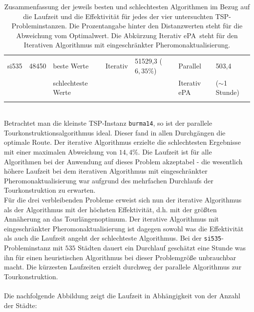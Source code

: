 \documentclass[doktyp=barbeit, sprache=german]{TUBAFarbeiten}
\begin{document}
\begin{table}[]
{\begin{tabular}{@{}lllllll@{}}
si535     & 48450   & \multicolumn{1}{l|}{beste Werte}        & Iterativ     & \multicolumn{1}{l|}{51529,3 ($6,35 \%$)}     & Parallel            & 503,4                         \\
          &         & \multicolumn{1}{l|}{schlechteste Werte} &              & \multicolumn{1}{l|}{}                        & Iterativ ePA        & ($\sim$1 Stunde)              \\ \bottomrule
\multicolumn{7}{l}{}                                                                                                                                                                      
\end{tabular}%
}
\captionsetup{justification=centering}
\caption{Zusammenfassung der jeweils besten und schlechtesten Algorithmen im Bezug auf die Laufzeit und die Effektivität für jedes der vier untersuchten TSP-Probleminstanzen. Die Prozentangabe hinter den Distanzwerten steht für die Abweichung vom Optimalwert. Die Abkürzung \glqq Iterativ ePA\grqq\, steht für den Iterativen Algorithmus mit eingeschränkter Pheromonaktualisierung.}
\label{tablebestworst}
\end{table}
\\Betrachtet man die kleinste TSP-Instanz \texttt{burma14}, so ist der parallele Tourkonstruktionsalgorithmus ideal. Dieser fand in allen Durchgängen die optimale Route. Der iterative Algorithmus erzielte die schlechtesten Ergebnisse mit einer maximalen Abweichung von $14,4 \%$. Die Laufzeit ist für alle Algorithmen bei der Anwendung auf dieses Problem akzeptabel - die wesentlich höhere Laufzeit bei dem iterativen Algorithmus mit eingeschränkter Pheromonaktualisierung war aufgrund des mehrfachen Durchlaufs der Tourkonstruktion zu erwarten.
\\Für die drei verbleibenden Probleme erweist sich nun der iterative Algorithmus als der Algorithmus mit der höchsten Effektivität, d.h. mit der größten Annäherung an das Tourlängenoptimum. Der iterative Algorithmus mit eingeschränkter Pheromonaktualisierung ist dagegen sowohl was die Effektivität als auch die Laufzeit angeht der schlechteste Algorithmus. Bei der \texttt{si535}-Probleminstanz mit $535$ Städten dauert ein Durchlauf geschätzt eine Stunde was ihn für einen heuristischen Algorithmus bei dieser Problemgröße unbrauchbar macht. Die kürzesten Laufzeiten erzielt durchweg der parallele Algorithmus zur Tourkonstruktion.
\\\\Die nachfolgende Abbildung zeigt die Laufzeit in Abhängigkeit von der Anzahl der Städte:
\end{document}
